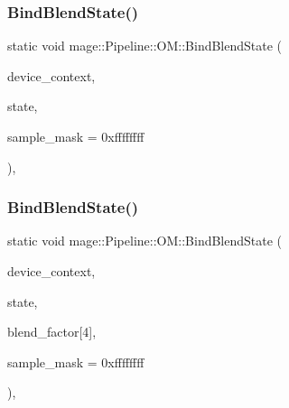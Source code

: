\subsubsection{\texorpdfstring{Bind\+Blend\+State()}{BindBlendState()}\hspace{0.1cm}{\footnotesize\ttfamily [1/2]}}
{\footnotesize\ttfamily static void mage\+::\+Pipeline\+::\+O\+M\+::\+Bind\+Blend\+State (\begin{DoxyParamCaption}\item[{I\+D3\+D11\+Device\+Context4 $\ast$}]{device\+\_\+context,  }\item[{I\+D3\+D11\+Blend\+State $\ast$}]{state,  }\item[{\hyperlink{namespacemage_a41c104c036fba3756a74e19f793eeaa1}{U32}}]{sample\+\_\+mask = {\ttfamily 0xffffffff} }\end{DoxyParamCaption})\hspace{0.3cm}{\ttfamily [static]}, {\ttfamily [noexcept]}}

\hypertarget{structmage_1_1_pipeline_1_1_o_m_aec599ec22f8694479158597c5118435b}{}\label{structmage_1_1_pipeline_1_1_o_m_aec599ec22f8694479158597c5118435b} 
\subsubsection{\texorpdfstring{Bind\+Blend\+State()}{BindBlendState()}\hspace{0.1cm}{\footnotesize\ttfamily [2/2]}}
{\footnotesize\ttfamily static void mage\+::\+Pipeline\+::\+O\+M\+::\+Bind\+Blend\+State (\begin{DoxyParamCaption}\item[{I\+D3\+D11\+Device\+Context4 $\ast$}]{device\+\_\+context,  }\item[{I\+D3\+D11\+Blend\+State $\ast$}]{state,  }\item[{const \hyperlink{namespacemage_aa97e833b45f06d60a0a9c4fc22ae02c0}{F32}}]{blend\+\_\+factor\mbox{[}4\mbox{]},  }\item[{\hyperlink{namespacemage_a41c104c036fba3756a74e19f793eeaa1}{U32}}]{sample\+\_\+mask = {\ttfamily 0xffffffff} }\end{DoxyParamCaption})\hspace{0.3cm}{\ttfamily [static]}, {\ttfamily [noexcept]}}

\hypertarget{structmage_1_1_pipeline_1_1_o_m_a03190c521a1f7b30d12dfdd9bc1ca933}{}\label{structmage_1_1_pipeline_1_1_o_m_a03190c521a1f7b30d12dfdd9bc1ca933} 
